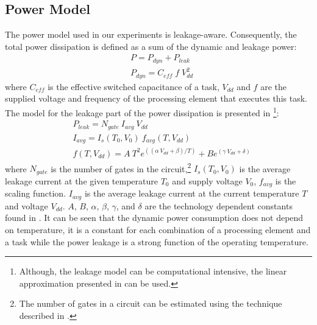 \subsection{Power Model}
The power model used in our experiments is leakage-aware. Consequently, the total power dissipation is defined as a sum of the dynamic and leakage power:
\begin{align*}
  & P = P_{dyn} + P_{leak} \\
  & P_{dyn} = C_{eff} \; f \; V_{dd}^2
\end{align*}
where $C_{eff}$ is the effective switched capacitance of a task, $V_{dd}$ and $f$ are the supplied voltage and frequency of the processing element that executes this task. The model for the leakage part of the power dissipation is presented in \cite{liao2005}\footnote{Although, the leakage model can be computational intensive, the linear approximation presented in \cite{liu2007} can be used.}:
\begin{align*}
  & P_{leak} = N_{gate} \: I_{avg} \: V_{dd} \\
  & I_{avg} = I_s(T_0, V_0) \: f_{avg}(T, V_{dd}) \\
  & f(T, V_{dd}) = A \: T^2 e^{((\alpha \: V_{dd} + \beta)/T)} + B e^{(\gamma \: V_{dd} + \delta)}
\end{align*}
where $N_{gate}$ is the number of gates in the circuit,\footnote{The number of gates in a circuit can be estimated using the technique described in \cite{li2004}.} $I_s (T_0, V_0)$ is the average leakage current at the given temperature $T_0$ and supply voltage $V_0$, $f_{avg}$ is the scaling function. $I_{avg}$ is the average leakage current at the current temperature $T$ and voltage $V_{dd}$. $A$, $B$, $\alpha$, $\beta$, $\gamma$, and $\delta$ are the technology dependent constants found in \cite{liao2005}. It can be seen that the dynamic power consumption does not depend on temperature, it is a constant for each combination of a processing element and a task while the power leakage is a strong function of the operating temperature.


